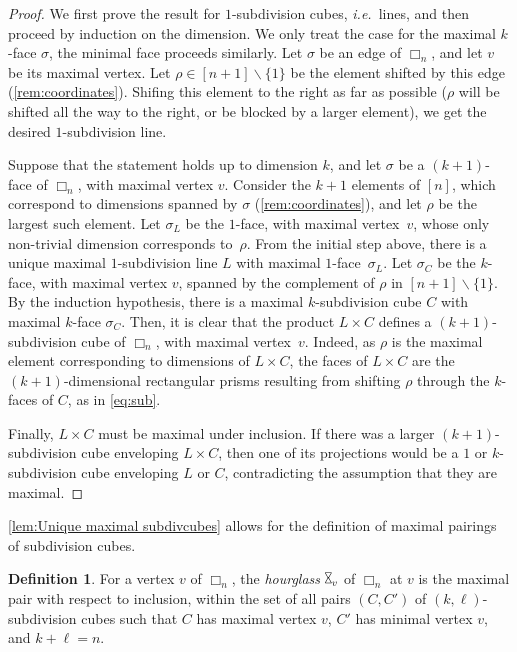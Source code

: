 \documentclass{amsart}
\newcommand{\darkblue}{\color{darkblue}} %
\theoremstyle{definition}
\newtheorem{definition}[theorem]{Definition}
\newcommand{\ssm}{\smallsetminus} %
\newcommand{\ie}{\textit{i.e.}~} %
\newcommand{\defn}[1]{\textsl{\darkblue #1}} %
\newcommand{\divcube}[1]{\Box_{#1}}
\newcommand{\hour}{\raisebox{0.065cm}{\rotatebox[origin=c]{90}{$\bowtie$}}_v}
\begin{document}
\begin{proof}
We first prove the result for $1$-subdivision cubes, \ie lines, and then proceed by induction on the dimension.
We only treat the case for the maximal $k$-face $\sigma$, the minimal face proceeds similarly.
Let $\sigma$ be an edge of $\divcube{n}$, and let $v$ be its maximal vertex.
Let $\rho \in [n+1]\ssm\{1\}$ be the element shifted by this edge (\cref{rem:coordinates}).
Shifing this element to the right as far as possible ($\rho$ will be shifted all the way to the right, or be blocked by a larger element), we get the desired $1$-subdivision line.

Suppose that the statement holds up to dimension $k$, and let $\sigma$ be a $(k+1)$-face of $\divcube{n}$, with maximal vertex $v$.
Consider the $k+1$ elements of $[n]$, which correspond to dimensions spanned by $\sigma$ (\cref{rem:coordinates}), and let $\rho$ be the largest such element.
Let $\sigma_L$ be the $1$-face, with maximal vertex~$v$, whose only non-trivial dimension corresponds to~$\rho$.
From the initial step above, there is a unique maximal $1$-subdivision line $L$ with maximal $1$-face~$\sigma_L$.
Let $\sigma_C$ be the $k$-face, with maximal vertex $v$, spanned by the complement of $\rho$ in $[n+1] \ssm \{1\}$. 
By the induction hypothesis, there is a maximal $k$-subdivision cube $C$ with maximal $k$-face $\sigma_C$. 
Then, it is clear that the product $L\times C$ defines a $(k+1)$-subdivision cube of $\divcube{n}$, with maximal vertex~$v$. 
Indeed, as $\rho$ is the maximal element corresponding to dimensions of $L\times C$, the faces of $L\times C$ are the $(k+1)$-dimensional rectangular prisms resulting from shifting $\rho$ through the $k$-faces of $C$, as in \cref{eq:sub}.

Finally, $L\times C$ must be maximal under inclusion.
If there was a larger $(k+1)$-subdivision cube enveloping $L\times C$, then one of its projections would be a $1$ or $k$-subdivision cube enveloping $L$ or $C$, contradicting the assumption that they are maximal.
\end{proof}

\cref{lem:Unique maximal subdivcubes} allows for the definition of maximal pairings of subdivision cubes.

\begin{definition} 
\label{def:hourglass}
For a vertex $v$ of $\divcube{n}$, the \defn{hourglass} $\hour$ of $\divcube{n}$ at $v$ is the maximal pair with respect to inclusion, within the set of all pairs $(C,C')$ of $(k,\ell)$-subdivision cubes such that $C$ has maximal vertex $v$, $C'$ has minimal vertex $v$, and $k+\ell = n$.
\end{definition}
\end{document}
